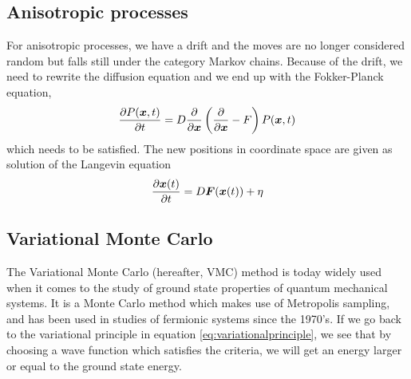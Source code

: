 \subsection{Anisotropic processes}
For anisotropic processes, we have a drift and the moves are no longer considered random but falls still under the category Markov chains. Because of the drift, we need to rewrite the diffusion equation and we end up with the Fokker-Planck equation,
\begin{equation}
\frac{\partial P(\boldsymbol{{x}},t)}{\partial t}=D\frac{\partial}{\partial \boldsymbol{{x}}}\left(\frac{\partial}{\partial \boldsymbol{{x}}}-F\right)P(\boldsymbol{{x}},t)
\end{equation}
which needs to be satisfied. The new positions in coordinate space are given as solution of the Langevin equation 
\begin{equation}
\frac{\partial \boldsymbol{{x}}(t)}{\partial t}=D\boldsymbol{{F}}(\boldsymbol{{x}}(t))+\eta
\end{equation}

\subsection{Variational Monte Carlo} \label{subsec:vmc}
The Variational Monte Carlo (hereafter, VMC) method is today widely used when it comes to the study of ground state properties of quantum mechanical systems. It is a Monte Carlo method which makes use of Metropolis sampling, and has been used in studies of fermionic systems since the 1970's. \cite{deb_variational_2014} If we go back to the variational principle in equation \eqref{eq:variationalprinciple}, we see that by choosing a wave function which satisfies the criteria, we will get an energy larger or equal to the ground state energy. \bigskip

